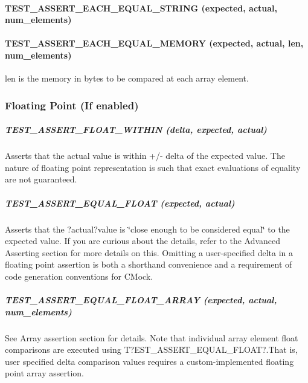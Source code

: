 \paragraph*{{\ttfamily T\+E\+S\+T\+\_\+\+A\+S\+S\+E\+R\+T\+\_\+\+E\+A\+C\+H\+\_\+\+E\+Q\+U\+A\+L\+\_\+\+S\+T\+R\+I\+NG (expected, actual, num\+\_\+elements)}}

\paragraph*{{\ttfamily T\+E\+S\+T\+\_\+\+A\+S\+S\+E\+R\+T\+\_\+\+E\+A\+C\+H\+\_\+\+E\+Q\+U\+A\+L\+\_\+\+M\+E\+M\+O\+RY (expected, actual, len, num\+\_\+elements)}}

{\ttfamily len} is the memory in bytes to be compared at each array element.

\subsubsection*{Floating Point (If enabled)}

\subparagraph*{{\ttfamily T\+E\+S\+T\+\_\+\+A\+S\+S\+E\+R\+T\+\_\+\+F\+L\+O\+A\+T\+\_\+\+W\+I\+T\+H\+IN (delta, expected, actual)}}

Asserts that the {\ttfamily actual} value is within +/-\/ {\ttfamily delta} of the {\ttfamily expected} value. The nature of floating point representation is such that exact evaluations of equality are not guaranteed.

\subparagraph*{{\ttfamily T\+E\+S\+T\+\_\+\+A\+S\+S\+E\+R\+T\+\_\+\+E\+Q\+U\+A\+L\+\_\+\+F\+L\+O\+AT (expected, actual)}}

Asserts that the ?actual?value is \char`\"{}close enough to be considered equal\char`\"{} to the {\ttfamily expected} value. If you are curious about the details, refer to the Advanced Asserting section for more details on this. Omitting a user-\/specified delta in a floating point assertion is both a shorthand convenience and a requirement of code generation conventions for C\+Mock.

\subparagraph*{{\ttfamily T\+E\+S\+T\+\_\+\+A\+S\+S\+E\+R\+T\+\_\+\+E\+Q\+U\+A\+L\+\_\+\+F\+L\+O\+A\+T\+\_\+\+A\+R\+R\+AY (expected, actual, num\+\_\+elements)}}

See Array assertion section for details. Note that individual array element float comparisons are executed using T?E\+S\+T\+\_\+\+A\+S\+S\+E\+R\+T\+\_\+\+E\+Q\+U\+A\+L\+\_\+\+F\+L\+O\+AT?.That is, user specified delta comparison values requires a custom-\/implemented floating point array assertion.

